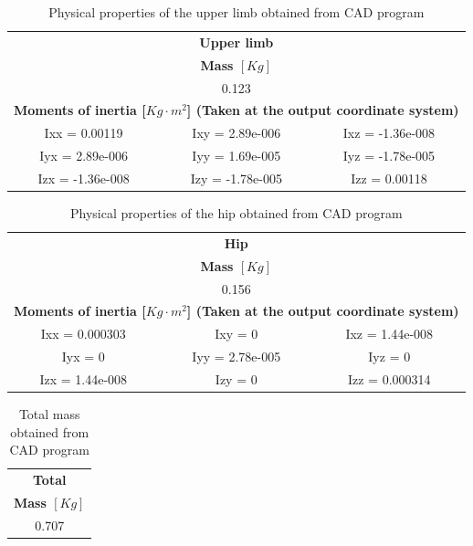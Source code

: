 \begin{table}[htbp]
\caption{Physical properties of the upper limb obtained from CAD program}
\begin{center}
\begin{tabular}{c|l|l}
\multicolumn{ 3}{c}{\Large \textbf{Upper limb}} \\
\multicolumn{ 3}{c}{\textbf{Mass $[Kg]$}} \\ \hline
\multicolumn{ 3}{c}{0.123} \\ \hline
\multicolumn{ 3}{c}{\textbf{Moments of inertia [$Kg \cdot m^2$] (Taken at the output coordinate system)}} \\ \hline
Ixx = 0.00119 & \multicolumn{1}{c|}{Ixy = 2.89e-006} & \multicolumn{1}{c}{Ixz = -1.36e-008} \\ \hline
Iyx = 2.89e-006 & \multicolumn{1}{c|}{Iyy = 1.69e-005} & \multicolumn{1}{c}{Iyz = -1.78e-005} \\ \hline
Izx = -1.36e-008 & \multicolumn{1}{c|}{Izy = -1.78e-005} & \multicolumn{1}{c}{Izz = 0.00118} \\ 
\end{tabular}
\end{center}
\label{tab:upper_limb_physical_properties}
\end{table}


\begin{table}[htbp]
\caption{Physical properties of the hip obtained from CAD program}
\begin{center}
\begin{tabular}{c|l|l}
\multicolumn{ 3}{c}{\Large \textbf{Hip}} \\ 
\multicolumn{ 3}{c}{\textbf{Mass $[Kg]$}} \\ \hline
\multicolumn{ 3}{c}{0.156} \\ \hline
\multicolumn{ 3}{c}{\textbf{Moments of inertia [$Kg \cdot m^2$] (Taken at the output coordinate system)}} \\ \hline
Ixx = 0.000303 & \multicolumn{1}{c|}{Ixy = 0} & \multicolumn{1}{c}{Ixz = 1.44e-008} \\ \hline
Iyx = 0 & \multicolumn{1}{c|}{Iyy = 2.78e-005} & \multicolumn{1}{c}{Iyz = 0} \\ \hline
Izx = 1.44e-008 & \multicolumn{1}{c|}{Izy = 0} & \multicolumn{1}{c}{Izz = 0.000314} \\ 
\end{tabular}
\end{center}
\label{tab:hip_physical_properties}
\end{table}


\begin{table}[htbp]
\caption{Total mass obtained from CAD program}
\begin{center}
\begin{tabular}{c|l|l}
\multicolumn{ 3}{c}{\Large \textbf{Total}} \\ 
\multicolumn{ 3}{c}{\textbf{Mass $[Kg]$}} \\ \hline
\multicolumn{ 3}{c}{0.707} \\ \hline
\end{tabular}
\end{center}
\label{tab:total_mass}
\end{table}


